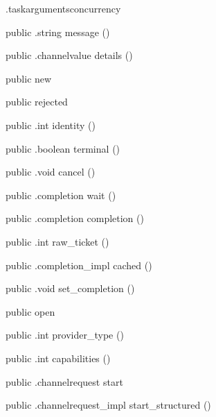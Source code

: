 \begin{CrexxClass}{.taskarguments}{concurrency}
\begin{Members}
    \Method
      {public}
      {.string}
      {message}
      {()}

    \Method
      {public}
      {.channelvalue}
      {details}
      {()}

    \Factory
      {public}
      {new}
      {}

    \Factory
      {public}
      {rejected}
      {}

    \Method
      {public}
      {.int}
      {identity}
      {()}

    \Method
      {public}
      {.boolean}
      {terminal}
      {()}

    \Method
      {public}
      {.void}
      {cancel}
      {()}

    \Method
      {public}
      {.completion}
      {wait}
      {()}

    \Method
      {public}
      {.completion}
      {completion}
      {()}

    \Method
      {public}
      {.int}
      {raw\_ticket}
      {()}

    \Method
      {public}
      {.completion\_impl}
      {cached}
      {()}

    \Method
      {public}
      {.void}
      {set\_completion}
      {()}

    \Factory
      {public}
      {open}
      {}

    \Method
      {public}
      {.int}
      {provider\_type}
      {()}

    \Method
      {public}
      {.int}
      {capabilities}
      {()}

    \Method
      {public}
      {.channelrequest}
      {start}
      {}

    \Method
      {public}
      {.channelrequest\_impl}
      {start\_structured}
      {()}


\end{Members}
\end{CrexxClass}
